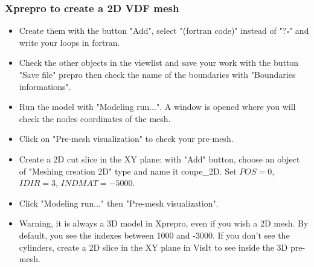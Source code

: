\documentclass[10pt, hyperref={unicode=true,pdfusetitle, bookmarks=true,bookmarksnumbered=false,bookmarksopen=false, breaklinks=false,pdfborder={0 0 1},backref=true,colorlinks=true,linkcolor=darkblue,pageanchor}]{beamer}
\begin{document}
\begin{frame}
\frametitle{Xprepro to create a 2D VDF mesh}
\begin{block}{}

\begin{itemize}
\item Create them with the button "Add", select "(fortran code)" instead of "?$\square$" and write your loops in fortran.
\item Check the other objects in the viewlist and save your work with the button "Save file" prepro then check the name of the boundaries with "Boundaries informations".
\item Run the model with "Modeling run...". A window is opened where you will check the nodes coordinates of the mesh.
\item Click on "Pre-mesh visualization" to check your pre-mesh.

\item Create a 2D cut slice in the XY plane: with "Add" button, choose an object of "Meshing creation 2D" type and name it coupe\_2D. Set $POS=0$, $IDIR=3$, $INDMAT=-5000$.
\item Click "Modeling run..." then "Pre-mesh visualization".
\item Warning, it is always a 3D model in Xprepro, even if you wish a 2D mesh. By default, you see the indexes between 1000 and -3000. If you don't see the cylinders, create a 2D slice in the XY plane in VisIt to see inside the 3D pre-mesh.
\end{itemize}

\end{block}
\end{frame}
\end{document}
